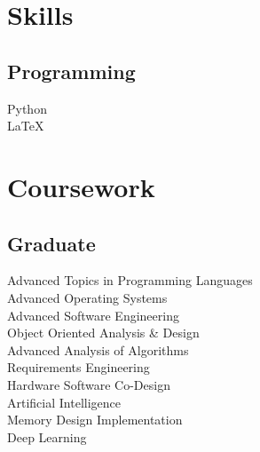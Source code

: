 \documentclass[]{vansh-resume}
\begin{document}
\begin{minipage}[t]{0.33\textwidth}

\section{Skills}
\subsection{Programming}
{\custombold
{Python}} \textbullet{}  {} \textbullet{} {} \textbullet{} {} 
{} \textbullet{} {}  \\
 {} \textbullet{} {} \textbullet{} {} \textbullet{} \LaTeX\ \textbullet{} {} \textbullet{} {} \textbullet{} {}  \\
{} \textbullet{} {} \textbullet{} {}  \textbullet{} {} \textbullet{} {} 
\sectionsep



\section{Coursework}
\subsection{Graduate}
Advanced Topics in Programming Languages\\
Advanced Operating Systems \\
Advanced Software Engineering  \\
Object Oriented Analysis \& Design \\
Advanced Analysis of Algorithms \\
Requirements Engineering \\
Hardware Software Co-Design \\
Artificial Intelligence \\
Memory Design Implementation \\
Deep Learning \\
\sectionsep


%
%

\end{minipage} 
\end{document}
